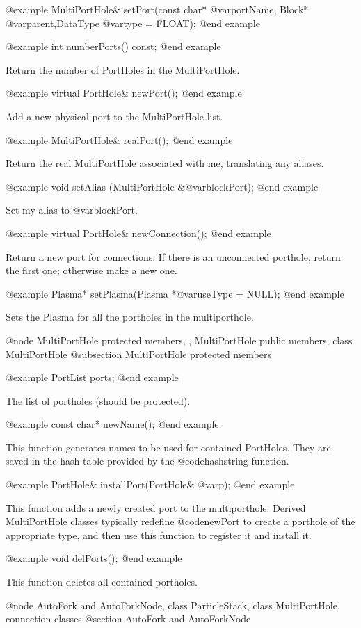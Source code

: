 @example
MultiPortHole& setPort(const char* @var{portName},
                       Block* @var{parent},DataType @var{type} = FLOAT);
@end example

@example
int numberPorts() const;
@end example

Return the number of PortHoles in the MultiPortHole.

@example
virtual PortHole& newPort();
@end example

Add a new physical port to the MultiPortHole list.

@example
MultiPortHole& realPort();
@end example

Return the real MultiPortHole associated with me, translating any
aliases.

@example
void setAlias (MultiPortHole &@var{blockPort});
@end example

Set my alias to @var{blockPort}.

@example
virtual PortHole& newConnection();
@end example

Return a new port for connections.  If there is an unconnected porthole,
return the first one; otherwise make a new one.

@example
Plasma* setPlasma(Plasma *@var{useType} = NULL);
@end example

Sets the Plasma for all the portholes in the multiporthole.

@node MultiPortHole protected members,  , MultiPortHole public members, class MultiPortHole
@subsection MultiPortHole protected members

@example
PortList ports;
@end example

The list of portholes (should be protected).

@example
const char* newName();
@end example

This function generates names to be used for contained PortHoles.  They
are saved in the hash table provided by the @code{hashstring} function.

@example
PortHole& installPort(PortHole& @var{p});
@end example

This function adds a newly created port to the multiporthole.  Derived
MultiPortHole classes typically redefine @code{newPort} to create a
porthole of the appropriate type, and then use this function to register
it and install it.

@example
void delPorts();
@end example

This function deletes all contained portholes.

@node AutoFork and AutoForkNode, class ParticleStack, class MultiPortHole, connection classes
@section AutoFork and AutoForkNode

